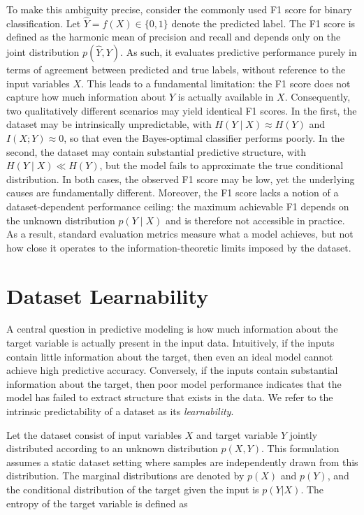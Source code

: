 \documentclass{article}
\begin{document}
To make this ambiguity precise, consider the commonly used F1 score 
for binary classification. 
Let $\hat{Y} = f(X) \in \{0,1\}$ denote the predicted label. 
The F1 score is defined as the harmonic mean of precision and recall and depends only on the joint distribution $p(\hat{Y}, Y)$. 
As such, it evaluates predictive performance purely in terms of agreement 
between predicted and true labels, without reference to the input variables $X$. This leads to a fundamental limitation: 
the F1 score does not capture how much information about $Y$ is actually available in $X$. Consequently, 
two qualitatively different scenarios may yield identical F1 scores. In the first, 
the dataset may be intrinsically unpredictable, with $H(Y \mid X) \approx H(Y)$ and $I(X; Y) \approx 0$, so that even the Bayes-optimal classifier performs poorly.
 In the second, the dataset may contain substantial predictive structure, with $H(Y \mid X) \ll H(Y)$, but the model fails to 
 approximate the true conditional distribution. In both cases, the observed F1 score may be low, yet the underlying causes are fundamentally different. 
 Moreover, the F1 score lacks a notion of a dataset-dependent performance ceiling: the maximum achievable F1 depends on the unknown 
 distribution $p(Y \mid X)$ and is therefore not accessible in practice. As a result, standard evaluation metrics measure what a model 
 achieves, but not how close it operates to the information-theoretic limits imposed by the dataset.

\section{Dataset Learnability}

A central question in predictive modeling is how much 
information about the target variable is actually present in the input data. Intuitively, 
if the inputs contain little information about the target, then even an ideal model cannot 
achieve high predictive accuracy. 
Conversely, if the inputs contain substantial information about the target, 
then poor model performance indicates that the model has failed to 
extract structure that exists in the data. We refer to the intrinsic predictability of a dataset as its \textit{learnability}.

Let the dataset consist of input variables $X$ and target variable $Y$ 
jointly distributed according to an unknown distribution $p(X,Y)$. 
This formulation assumes a static dataset setting where samples are independently drawn from this distribution.
The marginal distributions are denoted by $p(X)$ and $p(Y)$, and the conditional distribution of the target given the input is $p(Y|X)$.
The entropy of the target variable is defined as
\end{document}

